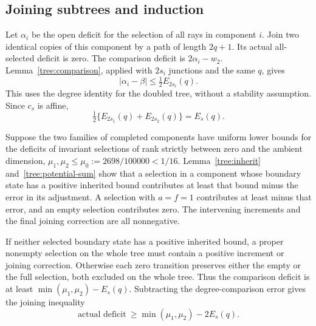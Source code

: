 \subsection{Joining subtrees and induction}
Let $\alpha_i$ be the open deficit for the selection of all rays in
component $i$.
Join two identical copies of this component by a path of length
$2q+1$. Its actual all-selected deficit is zero. The comparison
deficit is $2\alpha_i-w_2$. Lemma~\ref{tree:comparison}, applied
with $2s_i$ junctions and the same $q$, gives
\[
 |\alpha_i-\beta|\le\tfrac12 E_{2s_i}(q).
\]
This uses the degree identity for the doubled tree, without a stability
assumption. Since $c_s$ is affine,
\begin{equation}\label{tree:potential-sum}
 \tfrac12\{E_{2s_1}(q)+E_{2s_2}(q)\}=E_s(q).
\end{equation}

Suppose the two families of completed components have uniform lower
bounds for the deficits of invariant selections of rank strictly
between zero and the ambient dimension,
$\mu_1,\mu_2\le\mu_0:=2698/100000<1/16$.
Lemma~\ref{tree:inherit} and~\eqref{tree:potential-sum} show that a
selection in a component whose boundary state has a positive inherited
bound contributes at least that bound minus the error in its adjustment.
A selection with
$a=f=1$ contributes at least minus that error, and an empty selection
contributes zero. The intervening increments and the final joining
correction are all nonnegative.

If neither selected boundary state has a positive inherited bound, a proper
nonempty selection on the whole tree must contain a positive increment
or joining correction. Otherwise each zero transition preserves either
the empty or the full selection, both excluded on the whole tree. Thus the
comparison deficit is at least $\min(\mu_1,\mu_2)-E_s(q)$.
Subtracting the degree-comparison error gives the joining inequality
\begin{equation}\label{tree:gluing-bound}
 \text{actual deficit}\ \ge\min(\mu_1,\mu_2)-2E_s(q).
\end{equation}

